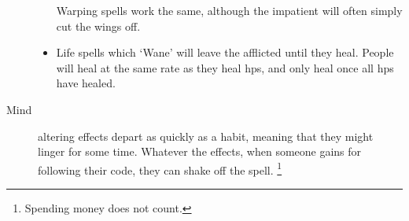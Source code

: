 \begin{multicols}{2}
\begin{description}
\begin{itemize}
    Warping spells work the same, although the impatient will often simply cut the wings off.
    \item
    Life spells which `Wane' will leave the afflicted until they heal.
    People will heal at the same rate as they heal \glspl{hp}, and only heal once all \glspl{hp} have healed.
  \end{itemize}
  \item[Mind]
  altering effects depart as quickly as a habit, meaning that they might linger for some time.
  Whatever the effects, when someone gains  for following their code, they can shake off the spell.%
  \footnote{Spending money does not count.}
\end{description}

\end{multicols}
